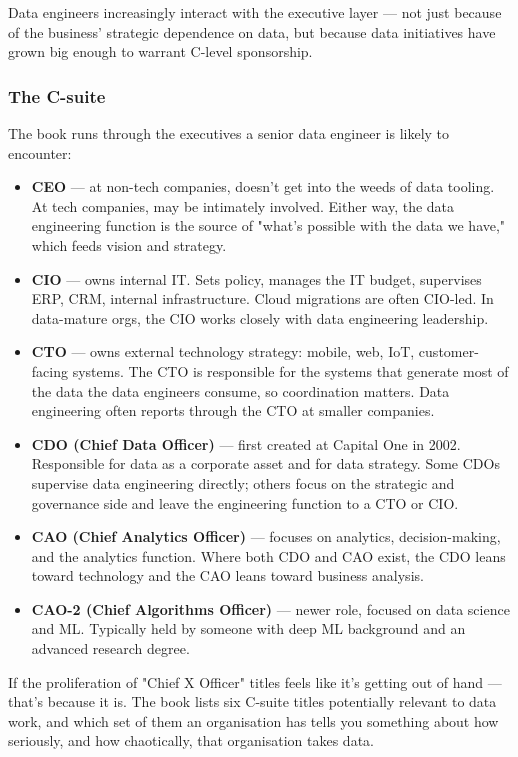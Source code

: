 Data engineers increasingly interact with the executive layer — not just because of the business' strategic dependence on data, but because data initiatives have grown big enough to warrant C-level sponsorship.

\subsubsection{The C-suite}

The book runs through the executives a senior data engineer is likely to encounter:

\begin{itemize}[leftmargin=*]
  \item \textbf{CEO} — at non-tech companies, doesn't get into the weeds of data tooling. At tech companies, may be intimately involved. Either way, the data engineering function is the source of "what's possible with the data we have," which feeds vision and strategy.
  \item \textbf{CIO} — owns internal IT. Sets policy, manages the IT budget, supervises ERP, CRM, internal infrastructure. Cloud migrations are often CIO-led. In data-mature orgs, the CIO works closely with data engineering leadership.
  \item \textbf{CTO} — owns external technology strategy: mobile, web, IoT, customer-facing systems. The CTO is responsible for the systems that generate most of the data the data engineers consume, so coordination matters. Data engineering often reports through the CTO at smaller companies.
  \item \textbf{CDO (Chief Data Officer)} — first created at Capital One in 2002. Responsible for data as a corporate asset and for data strategy. Some CDOs supervise data engineering directly; others focus on the strategic and governance side and leave the engineering function to a CTO or CIO.
  \item \textbf{CAO (Chief Analytics Officer)} — focuses on analytics, decision-making, and the analytics function. Where both CDO and CAO exist, the CDO leans toward technology and the CAO leans toward business analysis.
  \item \textbf{CAO-2 (Chief Algorithms Officer)} — newer role, focused on data science and ML. Typically held by someone with deep ML background and an advanced research degree.
\end{itemize}

If the proliferation of "Chief X Officer" titles feels like it's getting out of hand — that's because it is. The book lists six C-suite titles potentially relevant to data work, and which set of them an organisation has tells you something about how seriously, and how chaotically, that organisation takes data.

